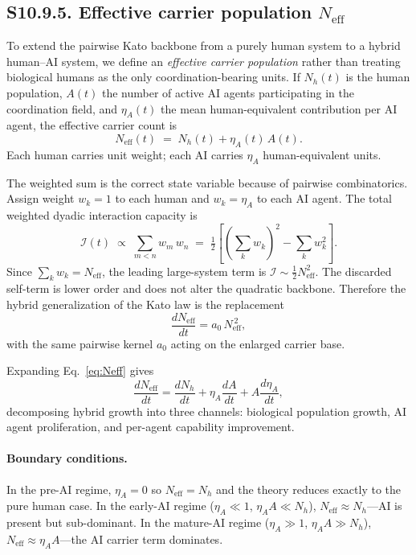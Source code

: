 \documentclass[11pt]{article}
\begin{document}
\subsection*{S10.9.5. Effective carrier population $N_{\mathrm{eff}}$}
\label{sec:S10_9_5_Neff}

To extend the pairwise Kato backbone from a purely human system to a hybrid human--AI system, we define an \emph{effective carrier population} rather than treating biological humans as the only coordination-bearing units.
If $N_h(t)$ is the human population, $A(t)$ the number of active AI agents participating in the coordination field, and $\eta_A(t)$ the mean human-equivalent contribution per AI agent, the effective carrier count is
\begin{equation}
N_{\mathrm{eff}}(t) \;=\; N_h(t) + \eta_A(t)\,A(t).
\label{eq:Neff}
\end{equation}
Each human carries unit weight; each AI carries $\eta_A$ human-equivalent units.

The weighted sum is the correct state variable because of pairwise combinatorics.
Assign weight $w_k=1$ to each human and $w_k=\eta_A$ to each AI agent.
The total weighted dyadic interaction capacity is
\[
\mathcal{I}(t) \;\propto\; \sum_{m<n} w_m\,w_n
  \;=\; \tfrac{1}{2}\!\left[\!\left(\sum_k w_k\right)^{\!2} - \sum_k w_k^2\right].
\]
Since $\sum_k w_k = N_{\mathrm{eff}}$, the leading large-system term is $\mathcal{I}\sim \tfrac{1}{2}N_{\mathrm{eff}}^2$.
The discarded self-term is lower order and does not alter the quadratic backbone.
Therefore the hybrid generalization of the Kato law is the replacement
\begin{equation}
\frac{dN_{\mathrm{eff}}}{dt} = a_0\,N_{\mathrm{eff}}^{\,2},
\label{eq:Neff_kato}
\end{equation}
with the same pairwise kernel $a_0$ acting on the enlarged carrier base.

Expanding Eq.~\eqref{eq:Neff} gives
\[
\frac{dN_{\mathrm{eff}}}{dt}
  = \frac{dN_h}{dt}
    + \eta_A\frac{dA}{dt}
    + A\frac{d\eta_A}{dt},
\]
decomposing hybrid growth into three channels: biological population growth, AI agent proliferation, and per-agent capability improvement.

\paragraph{Boundary conditions.}
In the pre-AI regime, $\eta_A=0$ so $N_{\mathrm{eff}}=N_h$ and the theory reduces exactly to the pure human case.
In the early-AI regime ($\eta_A\ll 1$, $\eta_A A \ll N_h$), $N_{\mathrm{eff}}\approx N_h$---AI is present but sub-dominant.
In the mature-AI regime ($\eta_A\gg 1$, $\eta_A A \gg N_h$), $N_{\mathrm{eff}}\approx \eta_A A$---the AI carrier term dominates.
\end{document}
